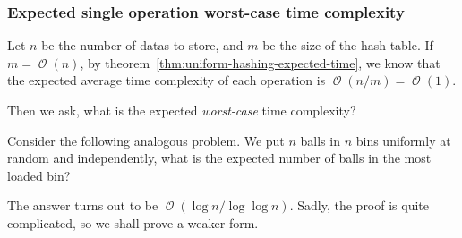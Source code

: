 \documentclass[12pt, a4paper]{article}
\newcommand{\ord}{\operatorname{\mathcal{O}}}
\theoremstyle{mystyle} %
\begin{document}
\subsubsection{Expected single operation worst-case time complexity}

Let $n$ be the number of datas to store, and $m$ be the size of the hash table.
If $m = \ord(n)$, by theorem~\ref{thm:uniform-hashing-expected-time},
we know that the expected average time complexity of each operation is $\ord(n/m) = \ord(1)$.

Then we ask, what is the expected \emph{worst-case} time complexity?

Consider the following analogous problem. We put $n$ balls in $n$ bins
uniformly at random and independently, what is the expected number
of balls in the most loaded bin?

The answer turns out to be $\ord( \log n / \log \log n )$. Sadly, the proof
is quite complicated, so we shall prove a weaker form. \medskip
\end{document}
